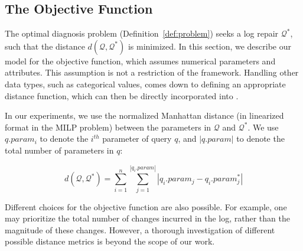 
\subsection{The Objective Function}

The optimal diagnosis problem (Definition~\ref{def:problem}) seeks a
log repair $\mathcal{Q}^*$, such that the distance
$d(\mathcal{Q},\mathcal{Q}^*)$ is minimized.  In this section, we
describe our model for the objective function, which assumes numerical
parameters and attributes. This assumption is not a restriction of the
\sys framework.
Handling other data types, such as categorical values, comes down to defining an appropriate distance function, which can then be directly incorporated into \sys.

In our experiments, we use the normalized Manhattan
distance (in linearized format in the MILP problem) 
between the parameters in $\mathcal{Q}$ and
$\mathcal{Q}^*$. We use $q.param_i$ to denote the $i^{th}$ parameter
of query $q$, and $|q.param|$ to denote the total number of parameters
in $q$: 

\[d(\mathcal{Q}, \mathcal{Q}^*) = \sum_{i = 1} ^{n} \sum_{j =
1}^{|q_i.param|} |q_i.param_j - q_i.param_j^*|\]
\vspace*{-0.1in}

Different choices for the objective function are also possible. For
example, one may prioritize the total number of changes incurred in
the log, rather than the magnitude of these changes. However, a
thorough investigation of different possible distance metrics is
beyond the scope of our work.


